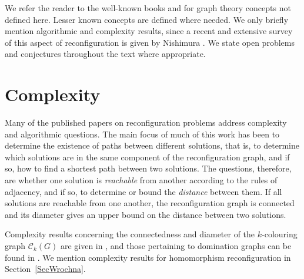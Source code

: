 \documentclass[12pt]{article}%
\begin{document}
We refer the reader to the well-known books \cite{26CM-CL} and
\cite{26CM-West} for graph theory concepts not defined here. Lesser known
concepts are defined where needed. We only briefly mention algorithmic and
complexity results, since a recent and extensive survey of this aspect of
reconfiguration is given by Nishimura \cite{26CM-Nishimura}. We state open
problems and conjectures throughout the text where appropriate.

\section{Complexity}

\label{SecComplex}Many of the published papers on reconfiguration problems
address complexity and algorithmic questions. The main focus of much of this
work has been to determine the existence of paths between different solutions,
that is, to determine which solutions are in the same component of the
reconfiguration graph, and if so, how to find a shortest path between two
solutions. The questions, therefore, are whether one solution is
\emph{reachable} from another according to the rules of adjacency, and if so,
to determine or bound the \emph{distance} between them. If all solutions are
reachable from one another, the reconfiguration graph is connected and its
diameter gives an upper bound on the distance between two solutions.

Complexity results concerning the connectedness and diameter of the
$k$-colouring graph $\mathcal{C}_{k}(G)$ are given in \cite[Section
6]{26CM-Nishimura}, and those pertaining to domination graphs can be found in
\cite[Section 7]{26CM-Nishimura}. We mention complexity results for
homomorphism reconfiguration in Section~\ref{SecWrochna}.
\end{document}
